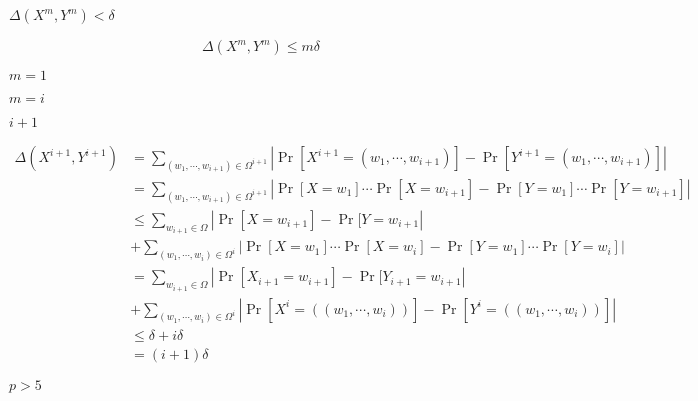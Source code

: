\documentclass[10pt]{book}
\begin{document}
\begin{mdSnippets}
\begin{mdInlineSnippet}%
$\Delta(X^m,Y^m) < \delta$\end{mdInlineSnippet}%
\begin{mdDisplaySnippet}%
\[%
\Delta(X^m,Y^m) \leq m\delta
\]%
\end{mdDisplaySnippet}%
\begin{mdInlineSnippet}[40aa2227f8ab9f9737e2ce467090bb9c]%
$m=1$\end{mdInlineSnippet}%
\begin{mdInlineSnippet}%
$m = i$\end{mdInlineSnippet}%
\begin{mdInlineSnippet}%
$i + 1$\end{mdInlineSnippet}%
\begin{mdDisplaySnippet}%
\[%
\begin{aligned}
\Delta(X^{i+1},Y^{i+1}) &= \sum_{(w_1,\cdots,w_{i+1}) \in \Omega^{i+1}} |\Pr[X^{i+1} = (w_1,\cdots,w_{i+1})] - \Pr[Y^{i+1} = (w_1,\cdots,w_{i+1})]| \\
&=  \sum_{(w_1,\cdots,w_{i+1}) \in \Omega^{i+1}} |\Pr[X = w_1]\cdots \Pr[X = w_{i+1}] - \Pr[Y =w_1]\cdots \Pr[Y = w_{i+1}]| \\
&\leq  \sum_{w_{i+1} \in \Omega} |\Pr[X = w_{i+1}] - \Pr[Y = w_{i+1}|  \\
&+\sum_{(w_1,\cdots,w_{i}) \in \Omega^{i}} |\Pr[X = w_1]\cdots \Pr[X = w_{i}] - \Pr[Y =w_1]\cdots \Pr[Y = w_{i}]| \\
&= \sum_{w_{i+1} \in \Omega} |\Pr[X_{i+1} = w_{i+1}] - \Pr[Y_{i+1} = w_{i+1}| \\
&+ \sum_{(w_1,\cdots,w_{i}) \in \Omega^{i}} |\Pr[X^{i} = ((w_1,\cdots,w_{i}))] - \Pr[Y^{i} = ((w_1,\cdots,w_{i}))]|\\
&\leq \delta + i\delta \\
&= (i+1)\delta
\end{aligned}
\]%
\end{mdDisplaySnippet}%
\begin{mdInlineSnippet}[8d9b48bf6d673faf8f47cc1a04fd8f79]%
$p>5$\end{mdInlineSnippet}%
\begin{mdInlineSnippet}[c81e728d9d4c2f636f067f89cc14862c]%

\end{mdInlineSnippet}
\end{mdSnippets}
\end{document}
